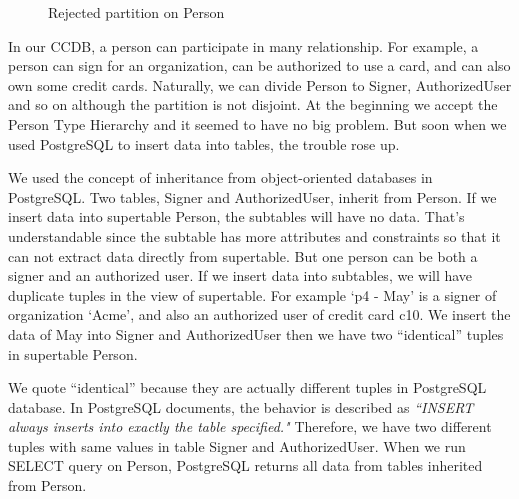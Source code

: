 \documentclass[11pt]{article}
\begin{document}
\begin{figure}
\centering
{}
\caption{Rejected partition on Person}
\label{fig:personhierarchy}
\end{figure}

\par
In our CCDB, a person can participate in many relationship. For example, a person can sign for an organization, can be authorized to use a card, and can also own some credit cards. Naturally, we can divide Person to Signer, AuthorizedUser and so on although the partition is not disjoint. At the beginning we accept the Person Type Hierarchy and it seemed to have no big problem. But soon when we used PostgreSQL to insert data into tables, the trouble rose up.

\par
We used the concept of inheritance from object-oriented databases in PostgreSQL. Two tables, Signer and AuthorizedUser, inherit from Person. If we insert data into supertable Person, the subtables will have no data. That's understandable since the subtable has more attributes and constraints so that it can not extract data directly from supertable. But one person can be both a signer and an authorized user. If we insert data into subtables, we will have duplicate tuples in the view of supertable. For example `p4 - May' is a signer of organization `Acme', and also an authorized user of credit card c10. We insert the data of May into Signer and AuthorizedUser then we have two ``identical'' tuples in supertable Person.

\par
We quote ``identical'' because they are actually different tuples in PostgreSQL database. In PostgreSQL documents, the behavior is described as \emph{``INSERT always inserts into exactly the table specified."} Therefore, we have two different tuples with same values in table Signer and AuthorizedUser. When we run SELECT query on Person, PostgreSQL returns all data from tables inherited from Person.
\end{document}
